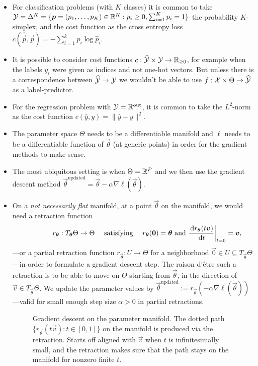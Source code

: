 \documentclass[12pt]{amsart}
\begin{document}
\begin{itemize}
\item For classification problems (with $K$ classes) it is common to take $\mathcal{Y} =  \Delta^K = \{\mathbf{\boldsymbol{p}} = (p_1, \ldots, p_K) \in \mathbb{R}^K : p_i \geq 0, \sum_{i = 1}^K p_i = 1\}$ the probability $K$-simplex, and the cost function as the cross entropy loss $c(\hat{\vec{p}}, \vec{p}) = - \sum_{i = 1}^k p_i \log \hat p_i$.
\item It is possible to consider cost functions $c : \widehat{\mathcal{Y}} \times \mathcal{Y} \to \mathbb{R}_{\geq 0}$, for example when the labels $y_i$ were given as indices and not one-hot vectors. But unless there is a correspondence between $\widehat{\mathcal{Y}} \rightarrow  \mathcal{Y}$ we wouldn't be able to use $f: \mathcal{X} \times \Theta \to \widehat{\mathcal{Y}}$ as a label-predictor.
\item For the regression problem with $\mathcal{Y} = \mathbb{R}^{\text{out}}$, it is common to take the $L^2$-norm as the cost function $c(\hat y, y) = \|\hat y - y\|^2$.
\item The parameter space $\Theta$ needs to be a differentiable manifold and $\ell$ needs to be a differentiable function of $\vec{\theta}$ (at generic points) in order for the gradient methods to make sense. 
\item The most ubiquitous setting is when $\Theta = \mathbb{R}^P$ and we then use the gradient descent method  $\vec{\theta}^{\text{updated}} = \vec{\theta} - \alpha \nabla \ell(\vec \theta)$. 
\item On a \emph{not necessarily flat} manifold, at a point $\vec{\theta}$ on the manifold, we would need a retraction function
\[
	\qquad \qquad r_{\mathbf{\boldsymbol{\theta}}} : T_{\mathbf{\boldsymbol{\theta}}} \Theta \to \Theta \quad \text{ satisfying } \quad r_{\mathbf{\boldsymbol{\theta}}}(\mathbf{\boldsymbol{0}}) = \mathbf{\boldsymbol{\theta}} \text{ and } \frac{\,\mathrm{d} r_{\mathbf{\boldsymbol{\theta}}}(t \mathbf{\boldsymbol{v}})} {\,\mathrm{d} t}\bigg|_{t = 0} = \mathbf{\boldsymbol{v}},
\]
---or a partial retraction function $r_{\vec{\theta}}: U \to \Theta$ for a neighborhood $\vec{0} \in U \subseteq T_{\vec{\theta}}\Theta$---in order to formulate a gradient descent step. The raison d'\^{e}tre such a retraction is to be able to move on $\Theta$ starting from $\vec{\theta}$, in the direction of $\vec{v}\in T_\vec{\theta} \Theta$. We update the parameter values by $\vec\theta^{\text{updated}} := r_\vec{\theta}(- \alpha \nabla \ell(\vec{\theta}))$---valid for small enough step size $\alpha>0$ in partial retractions. 
\begin{figure}[ht!]
\centering

\caption*{Gradient descent on the parameter manifold. The dotted path  $\{ r_{\vec{\theta}}(t\vec{v}): t \in [0,1]\}$ on the manifold is produced via the retraction. Starts off aligned with $\vec{v}$ when $t$ is infinitesimally small, and the retraction makes sure that the path stays on the manifold for nonzero finite $t$.} 
\end{figure}


\end{itemize}
\end{document}
